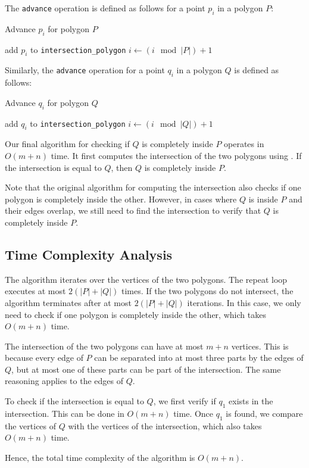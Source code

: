 \documentclass[12pt]{article}
\begin{document}
The \texttt{advance} operation is defined as follows for a point \(p_{i}\) in a polygon \(P\):

\begin{algorithm}[H]
    \caption{Advance \(p_{i}\) for polygon \(P\)}
    \begin{algorithmic}[1]
        \STATE add \(p_{i}\) to \texttt{intersection\_polygon}
    \ENDIF
    \STATE \(i \leftarrow (i \mod |P|) + 1\)
\end{algorithmic}
\end{algorithm}

Similarly, the \texttt{advance} operation for a point \(q_{i}\) in a polygon \(Q\) is defined as follows:

\begin{algorithm}[H]
    \caption{Advance \(q_{i}\) for polygon \(Q\)}
    \begin{algorithmic}[1]
        \STATE add \(q_{i}\) to \texttt{intersection\_polygon}
    \ENDIF
    \STATE \(i \leftarrow (i \mod |Q|) + 1\)
\end{algorithmic}
\end{algorithm}

Our final algorithm for checking if \(Q\) is completely inside \(P\) operates in \(O(m + n)\) time. It first computes the intersection of the two polygons using . If the intersection is equal to \(Q\), then \(Q\) is completely inside \(P\). 

Note that the original algorithm for computing the intersection also checks if one polygon is completely inside the other. However, in cases where \(Q\) is inside \(P\) and their edges overlap, we still need to find the intersection to verify that \(Q\) is completely inside \(P\).

\subsection*{Time Complexity Analysis}

The algorithm iterates over the vertices of the two polygons. The repeat loop executes at most \(2(|P| + |Q|)\) times. If the two polygons do not intersect, the algorithm terminates after at most \(2(|P| + |Q|)\) iterations. In this case, we only need to check if one polygon is completely inside the other, which takes \(O(m + n)\) time.

The intersection of the two polygons can have at most \(m + n\) vertices. This is because every edge of \(P\) can be separated into at most three parts by the edges of \(Q\), but at most one of these parts can be part of the intersection. The same reasoning applies to the edges of \(Q\).

To check if the intersection is equal to \(Q\), we first verify if \(q_1\) exists in the intersection. This can be done in \(O(m+n)\) time. Once \(q_1\) is found, we compare the vertices of \(Q\) with the vertices of the intersection, which also takes \(O(m+n)\) time.

Hence, the total time complexity of the algorithm is \(O(m + n)\).


\printbibliography
\end{document}
